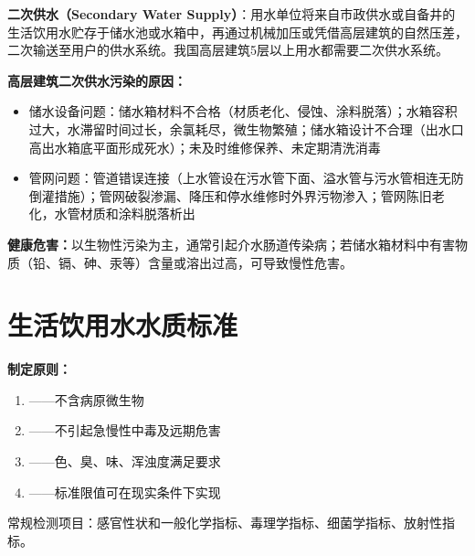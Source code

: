\begin{defbox}
\textbf{二次供水（Secondary Water Supply）}：用水单位将来自市政供水或自备井的生活饮用水贮存于储水池或水箱中，再通过机械加压或凭借高层建筑的自然压差，二次输送至用户的供水系统。我国高层建筑5层以上用水都需要二次供水系统。
\end{defbox}

\begin{tipbox}
\textbf{高层建筑二次供水污染的原因：}
\begin{itemize}[leftmargin=*]
    \item 储水设备问题：储水箱材料不合格（材质老化、侵蚀、涂料脱落）；水箱容积过大，水滞留时间过长，余氯耗尽，微生物繁殖；储水箱设计不合理（出水口高出水箱底平面形成死水）；未及时维修保养、未定期清洗消毒
    \item 管网问题：管道错误连接（上水管设在污水管下面、溢水管与污水管相连无防倒灌措施）；管网破裂渗漏、降压和停水维修时外界污物渗入；管网陈旧老化，水管材质和涂料脱落析出
\end{itemize}
\textbf{健康危害：}以生物性污染为主，通常引起介水肠道传染病；若储水箱材料中有害物质（铅、镉、砷、汞等）含量或溶出过高，可导致慢性危害。
\end{tipbox}

\section{生活饮用水水质标准}

\begin{keybox}
\textbf{制定原则：}
\begin{enumerate}[leftmargin=*]
    \item {}——不含病原微生物
    \item {}——不引起急慢性中毒及远期危害
    \item {}——色、臭、味、浑浊度满足要求
    \item {}——标准限值可在现实条件下实现
\end{enumerate}
\end{keybox}

常规检测项目：感官性状和一般化学指标、毒理学指标、细菌学指标、放射性指标。


